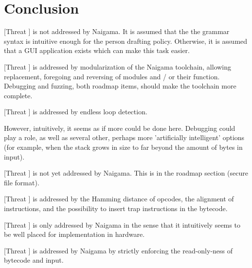 \section{Conclusion}

[Threat \thethreatintent] is not addressed by Naigama. It is assumed that
the the grammar syntax is intuitive enough for the
person drafting policy. Otherwise, it is assumed that a GUI application
exists which can make this task easier.

[Threat \thethreatbcerror] is addressed by modularization of the Naigama
toolchain, allowing replacement, foregoing and reversing of modules and / or
their function. Debugging and fuzzing, both roadmap items, should make the
toolchain more complete.

[Threat \thethreatbcexec] is addressed by endless loop detection.

However, intuitively, it seems as if more could be done here.
Debugging could play a role, as well as several other, perhaps
more 'artificially intelligent' options (for example, when the stack
grows in size to far beyond the amount of bytes in input).

[Threat \thethreatbcsign] is not yet addressed by Naigama. This is in
the roadmap section (secure file format).

[Threat \thethreatbcupset] is addressed by the Hamming distance of
opcodes, the alignment of instructions, and the possibility to insert
trap instructions in the bytecode.

[Threat \thethreatengine] is only addressed by Naigama in the sense that
it intuitively seems to be well placed for implementation
in hardware.

[Threat \thethreatinput] is addressed by Naigama by strictly enforcing
the read-only-ness of bytecode and input.
